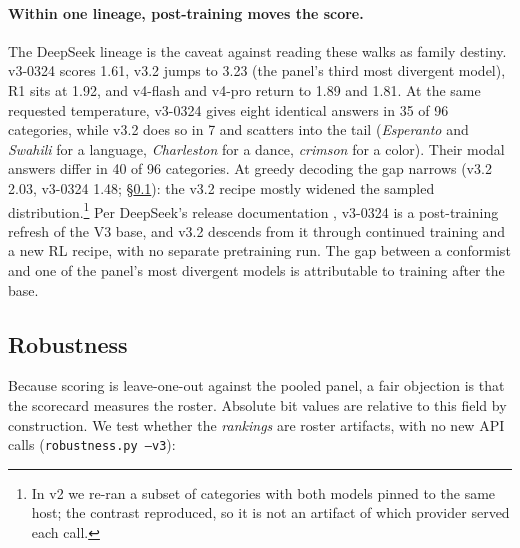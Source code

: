 \documentclass[11pt]{article}
\begin{document}
\paragraph{Within one lineage, post-training moves the score.}
The DeepSeek lineage is the caveat against reading these walks as family destiny. v3-0324 scores 1.61, v3.2 jumps to 3.23 (the panel's third most divergent model), R1 sits at 1.92, and v4-flash and v4-pro return to 1.89 and 1.81. At the same requested temperature, v3-0324 gives eight identical answers in 35 of 96 categories, while v3.2 does so in 7 and scatters into the tail (\emph{Esperanto} and \emph{Swahili} for a language, \emph{Charleston} for a dance, \emph{crimson} for a color). Their modal answers differ in 40 of 96 categories. At greedy decoding the gap narrows (v3.2 2.03, v3-0324 1.48; \S\ref{sec:robustness}): the v3.2 recipe mostly widened the sampled distribution.\footnote{In v2 we re-ran a subset of categories with both models pinned to the same host; the contrast reproduced, so it is not an artifact of which provider served each call.} Per DeepSeek's release documentation \citep{deepseek2025changelog}, v3-0324 is a post-training refresh of the V3 base, and v3.2 descends from it through continued training and a new RL recipe, with no separate pretraining run. The gap between a conformist and one of the panel's most divergent models is attributable to training after the base.

\subsection{Robustness}
\label{sec:robustness}

Because scoring is leave-one-out against the pooled panel, a fair objection is that the scorecard measures the roster. Absolute bit values are relative to this field by construction. We test whether the \emph{rankings} are roster artifacts, with no new API calls (\texttt{robustness.py --v3}):
\end{document}
